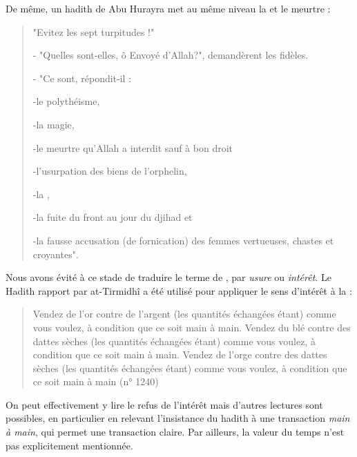 De même, un hadith de Abu Hurayra met au même niveau la \textit{\riba} et le meurtre : 
\begin{quote}
    "Evitez les sept turpitudes !"

- "Quelles sont-elles, ô Envoyé d'Allah?", demandèrent les fidèles.


- "Ce sont, répondit-il :

 

-le polythéisme,

-la magie,

-le meurtre qu'Allah a interdit sauf à bon droit

-l'usurpation des biens de l'orphelin,

-la \textit{\riba},

-la fuite du front au jour du djihad et

-la fausse accusation (de fornication) des femmes vertueuses, chastes et croyantes".
\end{quote}
 
  Nous avons évité à ce stade de traduire le terme de \textit{\riba}, par \textit{usure} ou \textit{intérêt}. Le Hadith rapport par at-Tirmidhî a été utilisé pour appliquer le sens d'intérêt à la \textit{\riba}  : 
 \begin{quote}
     Vendez de l'or contre de l'argent (les quantités échangées étant) comme vous voulez, à condition que ce soit main à main. Vendez du blé contre des dattes sèches (les quantités échangées étant) comme vous voulez, à condition que ce soit main à main. Vendez de l'orge contre des dattes sèches (les quantités échangées étant) comme vous voulez, à condition que ce soit main à main (n° 1240)
 \end{quote}  
 On peut effectivement y lire le refus de l'intérêt mais d'autres lectures sont possibles, en particulier en relevant l'insistance du hadith à une transaction \textit{main à main}, qui permet une transaction claire. Par ailleurs, la valeur du temps n'est pas explicitement mentionnée.
 

 
